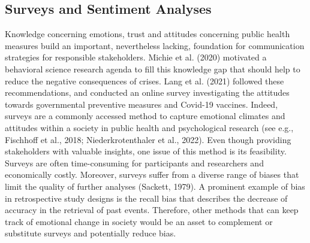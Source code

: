 \documentclass[
  english,
  jou,floatsintext]{apa7}
\begin{document}
\hypertarget{surveys-and-sentiment-analyses}{%
\subsection{Surveys and Sentiment Analyses}\label{surveys-and-sentiment-analyses}}

Knowledge concerning emotions, trust and attitudes concerning public health measures build an important, nevertheless lacking, foundation for communication strategies for responsible stakeholders. Michie et al. (2020) motivated a behavioral science research agenda to fill this knowledge gap that should help to reduce the negative consequences of crises.
Lang et al. (2021) followed these recommendations, and conducted an online survey investigating the attitudes towards governmental preventive measures and Covid-19 vaccines.
Indeed, surveys are a commonly accessed method to capture emotional climates and attitudes within a society in public health and psychological research (see e.g., Fischhoff et al., 2018; Niederkrotenthaler et al., 2022).
Even though providing stakeholders with valuable insights, one issue of this method is its feasibility. Surveys are often time-consuming for participants and researchers and economically costly. Moreover, surveys suffer from a diverse range of biases that limit the quality of further analyses (Sackett, 1979). A prominent example of bias in retrospective study designs is the recall bias that describes the decrease of accuracy in the retrieval of past events. Therefore, other methods that can keep track of emotional change in society would be an asset to complement or substitute surveys and potentially reduce bias.
\end{document}
